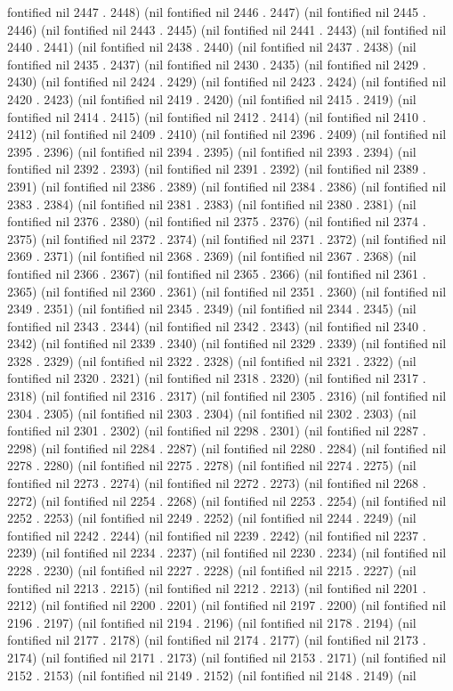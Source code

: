 fontified nil 2447 . 2448) (nil fontified nil 2446 . 2447) (nil fontified nil 2445 . 2446) (nil fontified nil 2443 . 2445) (nil fontified nil 2441 . 2443) (nil fontified nil 2440 . 2441) (nil fontified nil 2438 . 2440) (nil fontified nil 2437 . 2438) (nil fontified nil 2435 . 2437) (nil fontified nil 2430 . 2435) (nil fontified nil 2429 . 2430) (nil fontified nil 2424 . 2429) (nil fontified nil 2423 . 2424) (nil fontified nil 2420 . 2423) (nil fontified nil 2419 . 2420) (nil fontified nil 2415 . 2419) (nil fontified nil 2414 . 2415) (nil fontified nil 2412 . 2414) (nil fontified nil 2410 . 2412) (nil fontified nil 2409 . 2410) (nil fontified nil 2396 . 2409) (nil fontified nil 2395 . 2396) (nil fontified nil 2394 . 2395) (nil fontified nil 2393 . 2394) (nil fontified nil 2392 . 2393) (nil fontified nil 2391 . 2392) (nil fontified nil 2389 . 2391) (nil fontified nil 2386 . 2389) (nil fontified nil 2384 . 2386) (nil fontified nil 2383 . 2384) (nil fontified nil 2381 . 2383) (nil fontified nil 2380 . 2381) (nil fontified nil 2376 . 2380) (nil fontified nil 2375 . 2376) (nil fontified nil 2374 . 2375) (nil fontified nil 2372 . 2374) (nil fontified nil 2371 . 2372) (nil fontified nil 2369 . 2371) (nil fontified nil 2368 . 2369) (nil fontified nil 2367 . 2368) (nil fontified nil 2366 . 2367) (nil fontified nil 2365 . 2366) (nil fontified nil 2361 . 2365) (nil fontified nil 2360 . 2361) (nil fontified nil 2351 . 2360) (nil fontified nil 2349 . 2351) (nil fontified nil 2345 . 2349) (nil fontified nil 2344 . 2345) (nil fontified nil 2343 . 2344) (nil fontified nil 2342 . 2343) (nil fontified nil 2340 . 2342) (nil fontified nil 2339 . 2340) (nil fontified nil 2329 . 2339) (nil fontified nil 2328 . 2329) (nil fontified nil 2322 . 2328) (nil fontified nil 2321 . 2322) (nil fontified nil 2320 . 2321) (nil fontified nil 2318 . 2320) (nil fontified nil 2317 . 2318) (nil fontified nil 2316 . 2317) (nil fontified nil 2305 . 2316) (nil fontified nil 2304 . 2305) (nil fontified nil 2303 . 2304) (nil fontified nil 2302 . 2303) (nil fontified nil 2301 . 2302) (nil fontified nil 2298 . 2301) (nil fontified nil 2287 . 2298) (nil fontified nil 2284 . 2287) (nil fontified nil 2280 . 2284) (nil fontified nil 2278 . 2280) (nil fontified nil 2275 . 2278) (nil fontified nil 2274 . 2275) (nil fontified nil 2273 . 2274) (nil fontified nil 2272 . 2273) (nil fontified nil 2268 . 2272) (nil fontified nil 2254 . 2268) (nil fontified nil 2253 . 2254) (nil fontified nil 2252 . 2253) (nil fontified nil 2249 . 2252) (nil fontified nil 2244 . 2249) (nil fontified nil 2242 . 2244) (nil fontified nil 2239 . 2242) (nil fontified nil 2237 . 2239) (nil fontified nil 2234 . 2237) (nil fontified nil 2230 . 2234) (nil fontified nil 2228 . 2230) (nil fontified nil 2227 . 2228) (nil fontified nil 2215 . 2227) (nil fontified nil 2213 . 2215) (nil fontified nil 2212 . 2213) (nil fontified nil 2201 . 2212) (nil fontified nil 2200 . 2201) (nil fontified nil 2197 . 2200) (nil fontified nil 2196 . 2197) (nil fontified nil 2194 . 2196) (nil fontified nil 2178 . 2194) (nil fontified nil 2177 . 2178) (nil fontified nil 2174 . 2177) (nil fontified nil 2173 . 2174) (nil fontified nil 2171 . 2173) (nil fontified nil 2153 . 2171) (nil fontified nil 2152 . 2153) (nil fontified nil 2149 . 2152) (nil fontified nil 2148 . 2149) (nil 